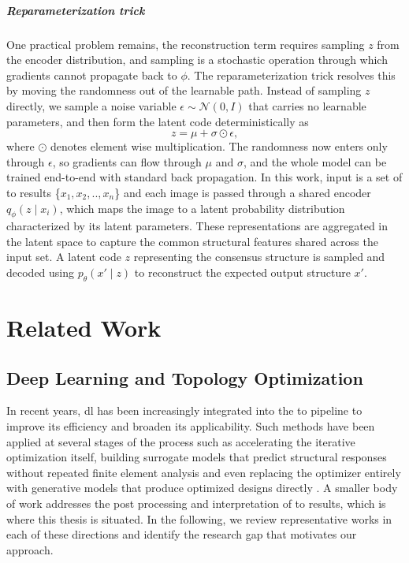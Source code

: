 \documentclass[
  numbers=noenddot,
  english,  %
  a4paper,  %
  twoside,  %
  bibliography=totoc,
  headsepline,
  cleardoublepage=empty,
  parskip=half,
  draft=false
]{scrbook}
\theoremstyle{break}
\begin{document}
\paragraph{\textbf{Reparameterization trick}}
One practical problem remains, the reconstruction term requires sampling $z$ from the encoder distribution, and sampling is a stochastic operation through which gradients cannot propagate back to $\phi$. The reparameterization trick \cite{c8} resolves this by moving the randomness out of the learnable path. Instead of sampling $z$ directly, we sample a noise variable $\epsilon \sim \mathcal{N}(0, I)$ that carries no learnable parameters, and then form the latent code deterministically as
%
\begin{equation}
	z = \mu + \sigma \odot \epsilon ,
	\label{eq:reparam}
\end{equation}
%
where $\odot$ denotes element wise multiplication. The randomness now enters only through $\epsilon$, so gradients can flow through $\mu$ and $\sigma$, and the whole model can be trained end-to-end with standard back propagation. In this work, input is a set of \gls{to} results \{$x_1,x_2,..,x_n$\} and each image is passed through a shared encoder $q_\phi(z \mid x_{i})$, which maps the image to a latent probability distribution characterized by its latent parameters. These representations are aggregated in the latent space to capture the common structural features shared across the input set. A latent code $z$ representing the consensus structure is sampled and decoded using $p_\theta(x' \mid z)$ to reconstruct the expected output structure $x'$.


\chapter{Related Work}\label{sec:relatedwork}

\section{Deep Learning and Topology Optimization}\label{sec:relatedwork:dpandto}

In recent years, \gls{dl} has been increasingly integrated into the \gls{to} pipeline to improve its efficiency and broaden its applicability. Such methods have been applied at several stages of the process such as accelerating the iterative optimization itself, building surrogate models that predict structural responses without repeated finite element analysis and even replacing the optimizer entirely with generative models that produce optimized designs directly \cite{c21}. A smaller body of work addresses the post processing and interpretation of \gls{to} results, which is where this thesis is situated. In the following, we review representative works in each of these directions and identify the research gap that motivates our approach.
\end{document}
